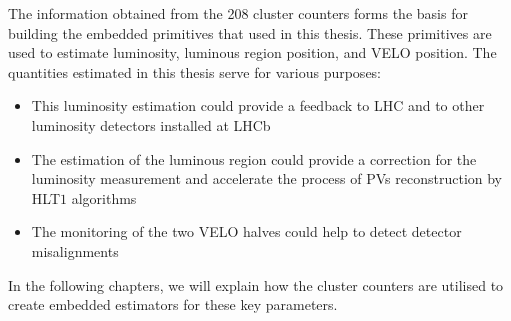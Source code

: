 The information obtained from the 208 cluster counters forms the basis for building the embedded primitives that used in this thesis. These primitives are used to estimate luminosity, luminous region position, and VELO position. The quantities estimated in this thesis serve for various purposes:
\begin{itemize}
    \item This luminosity estimation could provide a feedback to LHC and to other luminosity detectors installed at LHCb
    \item The estimation of the luminous region could provide a correction for the luminosity measurement and accelerate the process of PVs reconstruction by HLT$1$ algorithms
    \item The monitoring of the two VELO halves could help to detect detector misalignments
\end{itemize}

In the following chapters, we will explain how the cluster counters are utilised to create embedded estimators for these key parameters. 
